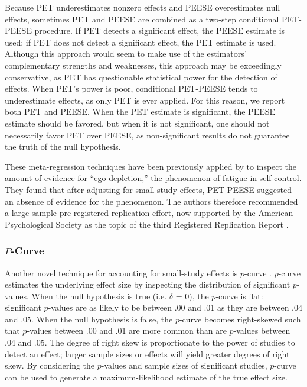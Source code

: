 \documentclass[man]{apa6}
\begin{document}
Because PET underestimates nonzero effects and PEESE overestimates null effects, sometimes PET and PEESE are combined as a two-step conditional PET-PEESE procedure. If PET detects a significant effect, the PEESE estimate is used; if PET does not detect a significant effect, the PET estimate is used. Although this approach would seem to make use of the estimators' complementary strengths and weaknesses, this approach may be exceedingly conservative, as PET has questionable statistical power for the detection of effects. When PET's power is poor, conditional PET-PEESE tends to underestimate effects, as only PET is ever applied. For this reason, we report both PET and PEESE. When the PET estimate is significant, the PEESE estimate should be favored, but when it is not significant, one should not necessarily favor PET over PEESE, as non-significant results do not guarantee the truth of the null hypothesis.

These meta-regression techniques have been previously applied by \citet{Carter:McCullough:2014} to inspect the amount of evidence for ``ego depletion,'' the phenomenon of fatigue in self-control. They found that after adjusting for small-study effects, PET-PEESE suggested an absence of evidence for the phenomenon. The authors therefore recommended a large-sample pre-registered replication effort, now supported by the American Psychological Society as the topic of the third Registered Replication Report \citep{APS:2014}. 


\subsubsection{$P$-Curve}
Another novel technique for accounting for small-study effects is $p$-curve \citep{Simonsohn:etal:2014,Simonsohn:etal:2014b}. $p$-curve estimates the underlying effect size by inspecting the distribution of significant $p$-values. 
When the null hypothesis is true (i.e. $\delta$ = 0), the $p$-curve is flat: significant $p$-values are as likely to be between .00 and .01 as they are between .04 and .05. When the null hypothesis is false, the $p$-curve becomes right-skewed such that $p$-values between .00 and .01 are more common than are $p$-values between .04 and .05. The degree of right skew is proportionate to the power of studies to detect an effect; larger sample sizes or effects will yield greater degrees of right skew. By considering the $p$-values and sample sizes of significant studies, $p$-curve can be used to generate a maximum-likelihood estimate of the true effect size.
\end{document}
